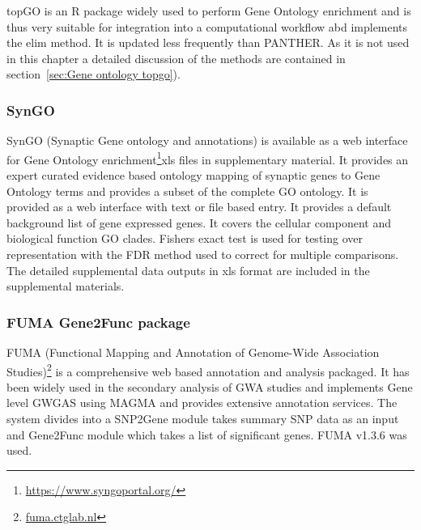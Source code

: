 topGO is an R package widely used to perform Gene Ontology enrichment and is thus very suitable for integration into a computational workflow abd implements the elim method. It is updated less frequently than PANTHER. As it is not used in this chapter a detailed discussion of the methods are contained in section~\ref{sec:Gene ontology topgo}). 
 \subsubsection{SynGO} SynGO (Synaptic Gene ontology and annotations) is available as a web interface for Gene Ontology enrichment\footnote{\url{https://www.syngoportal.org/}}xls files in supplementary material\cite{koopmans2019syngo}. It provides an expert curated evidence based ontology mapping of synaptic genes to Gene Ontology terms and provides a subset of the complete GO ontology. It is provided as a web interface with text or file based entry. It provides a default background list of gene expressed genes. It covers the cellular component and biological function GO clades. Fishers exact test is used for testing over representation with the FDR method\cite{benjamini1995controlling} used to correct for multiple comparisons. The detailed supplemental data outputs in xls format are included in the supplemental materials. 
\subsubsection{FUMA Gene2Func package} 
\label{sec:FUMA go enrichment}

FUMA (Functional Mapping and Annotation of Genome-Wide Association Studies)\footnote{\url{fuma.ctglab.nl}} is a comprehensive web based annotation and analysis packaged.\cite{watanabe2017functional} It has been widely used in the secondary analysis of GWA studies\cite{hill2019combined}\cite{savage2018genome} and implements Gene level GWGAS using MAGMA and provides extensive annotation services. The system divides into a SNP2Gene module takes summary SNP data as an input and Gene2Func module which takes a list of significant genes. FUMA v1.3.6 was used. 

